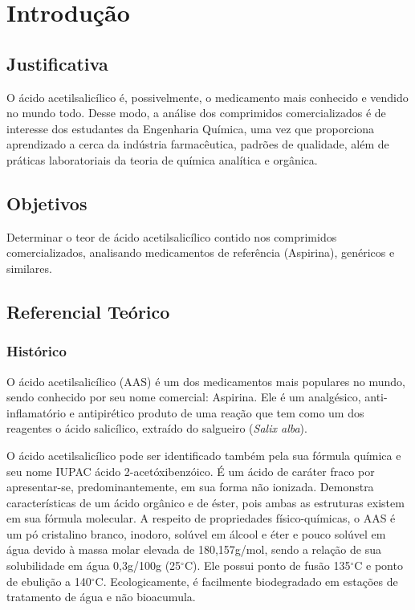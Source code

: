 \chapter{Introdução}\label{intro}
\section{Justificativa}\label{sub:just}    

O ácido acetilsalicílico é, possivelmente, o medicamento mais conhecido e vendido no mundo todo.
Desse modo, a análise dos comprimidos comercializados é de interesse dos estudantes da Engenharia
Química, uma vez que proporciona aprendizado a cerca da indústria farmacêutica, padrões de
qualidade, além de práticas laboratoriais da teoria de química analítica e orgânica.

\section{Objetivos}\label{sub:Objetivos}
Determinar o teor de ácido acetilsalicílico contido nos comprimidos comercializados, analisando
medicamentos de referência (Aspirina\R), genéricos e similares.

\section{Referencial Teórico}\label{sub:reft}

\subsection{Histórico}\label{sub:Histórico}

O ácido acetilsalicílico (AAS) é um dos medicamentos mais populares no mundo, sendo conhecido por
seu nome comercial: Aspirina\R. Ele é um analgésico, anti-inflamatório e antipirético produto de uma
reação que tem como um dos reagentes o ácido salicílico, extraído do salgueiro (\textit{Salix
alba}).  

O ácido acetilsalicílico pode ser identificado também pela sua fórmula química  e seu
nome IUPAC ácido 2-acetóxibenzóico. É um ácido de caráter fraco por apresentar-se,
predominantemente, em sua forma não ionizada. Demonstra características de um ácido orgânico e de
éster, pois ambas as estruturas existem em sua fórmula molecular. A respeito de propriedades
físico-químicas, o AAS é um pó cristalino branco, inodoro, solúvel em álcool e éter e pouco solúvel
em água devido à massa molar elevada de 180,157g/mol, sendo a relação de sua solubilidade em água
0,3g/100g (25$^\circ$C). Ele possui ponto de fusão 135$^\circ$C e ponto de ebulição a 140$^\circ$C.
Ecologicamente, é facilmente biodegradado em estações de tratamento de água e não
bioacumula.~\cite{teves}

